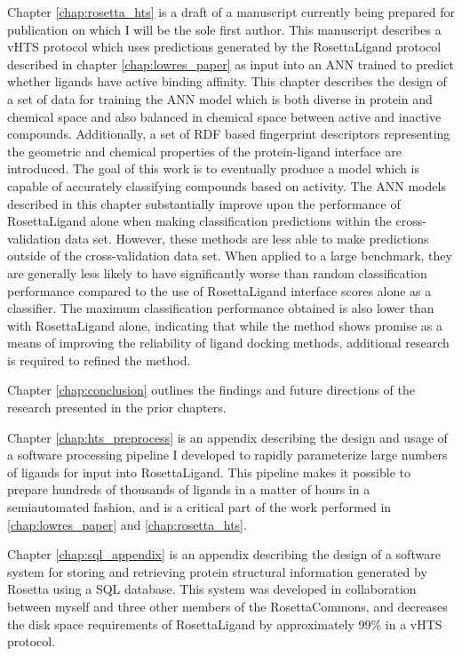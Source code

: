 Chapter \ref{chap:rosetta_hts} is a draft of a manuscript currently being prepared for publication on which I will be the sole first author.
This manuscript describes a \ac{vHTS} protocol which uses predictions generated by the RosettaLigand protocol described in chapter \ref{chap:lowres_paper} as input into an \ac{ANN} trained to predict whether ligands have active binding affinity.
This chapter describes the design of a set of data for training the \ac{ANN} model which is both diverse in protein and chemical space and also balanced in chemical space between active and inactive compounds.
Additionally, a set of \ac{RDF} based fingerprint descriptors representing the geometric and chemical properties of the protein-ligand interface are introduced.
The goal of this work is to eventually produce a model which is capable of accurately classifying compounds based on activity.
The \ac{ANN} models described in this chapter substantially improve upon the performance of RosettaLigand alone when making classification predictions within the cross-validation data set.
However, these methods are less able to make predictions outside of the cross-validation data set.  When applied to a large benchmark, they are generally less likely to have significantly worse than random classification performance compared to the use of RosettaLigand interface scores alone as a classifier.
The maximum classification performance obtained is also lower than with RosettaLigand alone, indicating that while the method shows promise as a means of improving the reliability of ligand docking methods, additional research is required to refined the method.

Chapter \ref{chap:conclusion} outlines the findings and future directions of the research presented in the prior chapters.

Chapter \ref{chap:hts_preprocess} is an appendix describing the design and usage of a software processing pipeline I developed to rapidly parameterize large numbers of ligands for input into RosettaLigand.
This pipeline makes it possible to prepare hundreds of thousands of ligands in a matter of hours in a semiautomated fashion, and is a critical part of the work performed in \ref{chap:lowres_paper} and \ref{chap:rosetta_hts}.

Chapter \ref{chap:sql_appendix} is an appendix describing the design of a software system for storing and retrieving protein structural information generated by Rosetta using a \ac{SQL} database.
This system was developed in collaboration between myself and three other members of the RosettaCommons, and decreases the disk space requirements of RosettaLigand by approximately 99\% in a \ac{vHTS} protocol.

